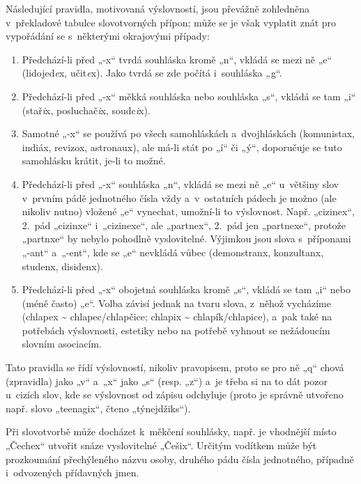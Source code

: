 Následující pravidla, motivovaná výslovností, jsou převážně zohledněna v překladové tabulce
slovotvorných přípon; může se je však vyplatit znát pro vypořádání se
s některými okrajovými případy:

\begin{enumerate}
\item Předchází-li před „-x“ tvrdá souhláska kromě „n“, vkládá se mezi ně „e“
(lidojed\emph{e}x, učit\emph{e}x). Jako tvrdá se zde počítá i souhláska „g“.
\item Předchází-li před „-x“ měkká souhláska nebo souhláska „s“,
vkládá se tam „i“ (stař\emph{i}x, posluchač\emph{i}x, soudc\emph{i}x).
\item Samotné „-x“ se používá po všech samohláskách a dvojhláskách
(komunistax, indiáx, revizox, astronaux), ale má-li stát po „í“ či „ý“,
doporučuje se tuto samohlásku krátit, je-li to možné.
\item Předchází-li před „-x“ souhláska „n“, vkládá se mezi ně „e“
u většiny slov v prvním pádě jednotného čísla vždy a v ostatních pádech
je možno (ale nikoliv nutno) vložené „e“ vynechat, umožní-li to výslovnost.
Např. „cizinex“, 2. pád „cizinxe“ i „cizinexe“, ale „partnex“, 2. pád
jen „partnexe“, protože „partnxe“ by nebylo pohodlně vyslovitelné.
Výjimkou jsou slova s příponami „-ant“ a „-ent“, kde se „e“ nevkládá vůbec
(demonstranx, konzultanx, studenx, disidenx).
\item Předchází-li před „-x“ obojetná souhláska kromě „s“, vkládá se tam „i“
nebo (méně často) „e“. Volba závisí jednak na tvaru slova, z něhož vycházíme
(chlapex \textasciitilde{} chlapec/chlapčice; chlapix \textasciitilde{} chlapík/chlapice),
a pak také na potřebách výslovnosti, estetiky nebo na potřebě vyhnout se
nežádoucím slovním asociacím.
\end{enumerate}

Tato pravidla se řídí výslovností, nikoliv pravopisem, proto se pro ně
„q“ chová (zpravidla) jako „v“ a „x“ jako „s“ (resp. „z“)
a je třeba si na to dát pozor u cizích slov, kde se výslovnost od zápisu
odchyluje (proto je správně utvořeno např. slovo „teenagix“,
čteno „týnejdžiks“).

Při slovotvorbě může docházet k měkčení souhlásky, např.
je vhodnější místo „Čechex“
utvořit snáze vyslovitelné „Češix“.
Určitým vodítkem může být prozkoumání přechýleného názvu
osoby,
druhého pádu čísla jednotného, případně i odvozených přídavných
jmen.

